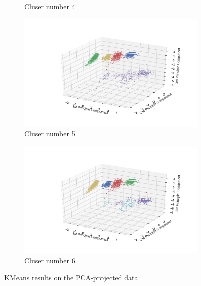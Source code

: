 \documentclass[12pt]{article}
\begin{document}
\begin{figure}
\begin{subfigure}[b]{0.31\textwidth}
        \caption{Cluser number 4}
        \label{fig:KMeans-trainbyPCA-4}
    \end{subfigure}
    
    \begin{subfigure}[b]{0.31\textwidth}
        \includegraphics[width=\textwidth]{images/KMeans-trainbyPCA-5.png}
        \caption{Cluser number 5}
        \label{fig:KMeans-trainbyPCA-5}
    \end{subfigure}
    \begin{subfigure}[b]{0.31\textwidth}
        \includegraphics[width=\textwidth]{images/KMeans-trainbyPCA-6.png}
        \caption{Cluser number 6}
        \label{fig:KMeans-trainbyPCA-6}
    \end{subfigure}
    \label{fig:KMeans-trainbyPCA}
    \caption{KMeans results on the PCA-projected data}
\end{figure}
\end{document}

